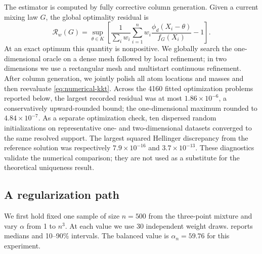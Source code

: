 \documentclass[11pt]{article}
\theoremstyle{definition}
\theoremstyle{remark}
\begin{document}
The estimator is computed by fully corrective column generation.  Given a
current mixing law $G$, the global optimality residual is
\begin{equation}\label{eq:numerical-kkt}
 \mathcal R_w(G)=
 \sup_{\theta\in K}\left[
 \frac{1}{\sum_iw_i}\sum_{i=1}^n
 w_i\frac{\phi_d(X_i-\theta)}{f_G(X_i)}-1
 \right].
\end{equation}
At an exact optimum this quantity is nonpositive.  We globally search the
one-dimensional oracle on a dense mesh followed by local refinement; in two
dimensions we use a rectangular mesh and multistart continuous refinement.
After column generation, we jointly polish all atom locations and masses and
then reevaluate \eqref{eq:numerical-kkt}.  Across the 4160 fitted optimization
problems reported below, the largest recorded residual was at most
$1.86\times10^{-6}$, a conservatively upward-rounded bound; the
one-dimensional maximum rounded to $4.84\times10^{-7}$.  As a separate
optimization check, ten dispersed random
initializations on representative one- and two-dimensional datasets converged
to the same resolved support.  The largest squared Hellinger discrepancy from
the reference solution was respectively $7.9\times10^{-16}$ and
$3.7\times10^{-13}$.  These diagnostics validate the numerical comparison;
they are not used as a substitute for the theoretical uniqueness result.

\subsection{A regularization path}

We first hold fixed one sample of size $n=500$ from the three-point mixture and
vary $\alpha$ from 1 to $n^3$.  At each value we use 30 independent weight
draws.   reports medians and 10--90\% intervals.  The balanced
value is $\alpha_n=59.76$ for this experiment.
\end{document}
